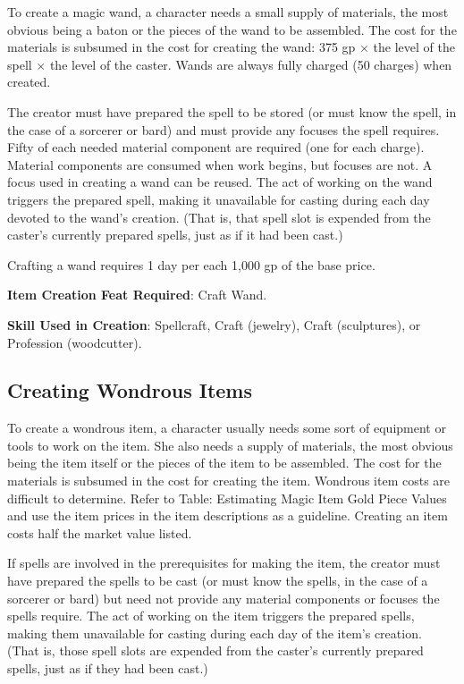 To create a magic wand, a character needs a small supply of materials, the most obvious being a baton or the pieces of the wand to be assembled. The cost for the materials is subsumed in the cost for creating the wand: 375 gp \mbox{$\times$} the level of the spell \mbox{$\times$} the level of the caster. Wands are always fully charged (50 charges) when created.
				
The creator must have prepared the spell to be stored (or must know the spell, in the case of a sorcerer or bard) and must provide any focuses the spell requires. Fifty of each needed material component are required (one for each charge). Material components are consumed when work begins, but focuses are not. A focus used in creating a wand can be reused. The act of working on the wand triggers the prepared spell, making it unavailable for casting during each day devoted to the wand's creation. (That is, that spell slot is expended from the caster's currently prepared spells, just as if it had been cast.)
				
Crafting a wand requires 1 day per each 1,000 gp of the base price.
				
\textbf{Item Creation Feat Required}: Craft Wand.
				
\textbf{Skill Used in Creation}: Spellcraft, Craft (jewelry), Craft (sculptures), or Profession (woodcutter).
				
\subsection{Creating Wondrous Items}

				
To create a wondrous item, a character usually needs some sort of equipment or tools to work on the item. She also needs a supply of materials, the most obvious being the item itself or the pieces of the item to be assembled. The cost for the materials is subsumed in the cost for creating the item. Wondrous item costs are difficult to determine. Refer to Table: Estimating Magic Item Gold Piece Values and use the item prices in the item descriptions as a guideline. Creating an item costs half the market value listed.
				
If spells are involved in the prerequisites for making the item, the creator must have prepared the spells to be cast (or must know the spells, in the case of a sorcerer or bard) but need not provide any material components or focuses the spells require. The act of working on the item triggers the prepared spells, making them unavailable for casting during each day of the item's creation. (That is, those spell slots are expended from the caster's currently prepared spells, just as if they had been cast.)
				
